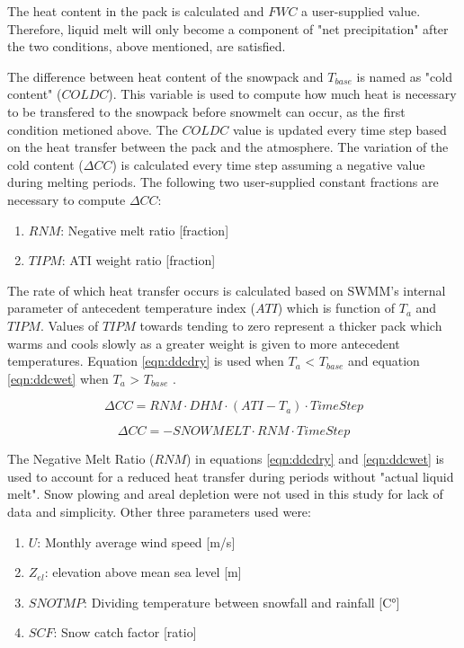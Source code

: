 The heat content in the pack is calculated and $FWC$ a user-supplied value. Therefore, liquid melt will only become a component of "net precipitation" after the two conditions, above mentioned, are satisfied.

 The difference between heat content of the snowpack and $T_{base}$ is named as "cold content" ($COLDC$). This variable is used to compute how much heat is necessary to be transfered to the snowpack before snowmelt can occur, as the first condition metioned above. The $COLDC$ value is updated every time step based on the heat transfer between the pack and the atmosphere. The variation of the cold content ($\Delta CC$) is calculated every time step assuming a negative value during melting periods. The following two user-supplied constant fractions are necessary to compute $\Delta CC$:
\begin{enumerate}
    \item $RNM$: Negative melt ratio [fraction]
    \item $TIPM$: ATI weight ratio [fraction]
\end{enumerate}

The rate of which heat transfer occurs is calculated based on SWMM's internal parameter of antecedent temperature index ($ATI$) which is function of $T_a$ and $TIPM$. Values of $TIPM$ towards tending to zero represent a thicker pack which warms and cools slowly as a greater weight is given to more antecedent temperatures. Equation \ref{eqn:ddcdry} is used when $T_a$ < $T_{base}$ and equation \ref{eqn:ddcwet} when $T_a$ > $T_{base}$ \cite{Rossman2016}. 

\begin{equation}
\label{eqn:ddcdry}
\Delta CC = RNM \cdot DHM \cdot (ATI - T_a) \cdot Time Step
\end{equation}

\begin{equation}
\label{eqn:ddcwet}
\Delta CC = - SNOWMELT \cdot RNM \cdot Time Step
\end{equation}

The Negative Melt Ratio ($RNM$) in equations \ref{eqn:ddcdry} and \ref{eqn:ddcwet} is used to account for a reduced heat transfer during periods without "actual liquid melt".
Snow plowing and areal depletion were not used in this study for lack of data and simplicity.
Other three parameters used were:

\begin{enumerate}
    \item $U$: Monthly average wind speed [m/s]
    \item $Z_{el}$: elevation above mean sea level [m]
    \item $SNOTMP$: Dividing temperature between snowfall and rainfall [C°]
    \item $SCF$: Snow catch factor [ratio]
\end{enumerate}

